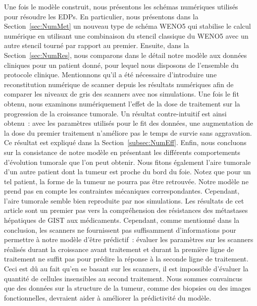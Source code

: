 \documentclass[11pt]{amsart}
\numberwithin{equation}{section}
\begin{document}
Une fois le modèle construit, nous présentons les schémas numériques utilisés pour résoudre les EDPs. 
En particulier, nous présentons dans la 
Section~\ref{sec:NumMet} un nouveau type de schéma WENO5 qui stabilise le calcul numérique en utilisant une combinaison du stencil classique du WENO5 avec un autre stencil tourné par rapport au premier. Ensuite, dans la Section~\ref{sec:NumRes}, nous comparons dans le détail notre modèle aux données cliniques pour un patient donné, pour lequel nous disposons de l'ensemble du protocole clinique. 
Mentionnons qu'il a été nécessaire d'introduire une reconstitution numérique de scanner depuis les résultats numériques afin de comparer les niveaux de gris des scanners avec nos simulations. 
Une fois le fit obtenu, nous examinons numériquement l'effet de la dose de traitement sur la progression de la croissance tumorale. Un résultat contre-intuitif est ainsi obtenu~: avec les paramètres utilisés pour le fit des données, une augmentation de la dose du premier traitement n'améliore pas le temps de survie sans aggravation. Ce résultat est expliqué dans la Section~\ref{subsec:NumEff}. 
Enfin, nous concluons sur la consistance de notre modèle en présentant les différents comportements d'évolution tumorale que l'on peut obtenir. 
Nous fitons également l'aire tumorale d'un autre patient dont la tumeur est proche du bord du foie. 
Notez que pour un tel patient, la forme de la tumeur ne pourra pas être retrouvée. Notre modèle ne prend pas en compte les contraintes mécaniques correspondantes. Cependant, l'aire tumorale semble bien reproduite par nos simulations. 
Les résultats de cet article sont un premier pas vers la compréhension des résistances des métastases hépatiques de GIST aux médicaments. Cependant, comme mentionné dans la conclusion, les scanners ne fournissent pas suffisamment d'informations pour permettre à notre modèle d'être prédictif~: évaluer les paramètres sur les scanners réalisés durant la croissance avant traitement et durant la première ligne de traitement ne suffit pas pour prédire la réponse à la seconde ligne de traitement. Ceci est dû au fait qu'en se basant sur les scanners, il est impossible d'évaluer la quantité de cellules insensibles au second traitement. Nous sommes convaincus que des données sur la structure de la tumeur, comme des biopsies ou des images fonctionnelles, devraient aider à améliorer la prédictivité du modèle.

\end{document}
